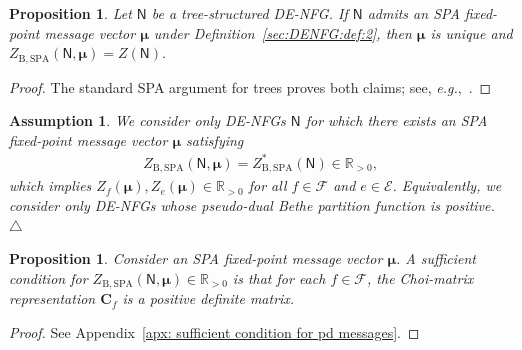 \documentclass[journal]{IEEEtran}
\newcommand{\add}[1]{{\color{black}#1}}
\newtheorem{assumption}[theorem]{Assumption}
\newtheorem{proposition}[theorem]{Proposition}
\newcommand{\manualendsymbol}[1]{%
  \leavevmode\unskip\penalty9999\hbox{}\nobreak\hfill
  \quad\hbox{#1}}
\newcommand{\eremark}{\manualendsymbol{\ensuremath{\triangle}}}
\newcommand{\vect}[1]{ \bm{#1} }
\newcommand{\setEfull}{ \mathcal{E} }
\newcommand{\setF}{ \mathcal{F} }
\newcommand{\sR}{\mathbb{R}}
\newcommand{\vmu}{ \vect{ \mu } }
\newcommand{\graphN}{ \mathsf{N} }
\newcommand{\ZBSPA}{ Z_{\mathrm{B,SPA}} }
\newcommand{\matr}[1]{\vect{#1}}
\newcommand*{\eg}{\textit{e.g.}}
\begin{document}
\begin{proposition}\label{sec:DENFG:prop:1}
  \add{Let $\graphN$ be a tree-structured DE-NFG. If $\graphN$ admits an SPA
    fixed-point message vector $\vmu$ under
    Definition~\ref{sec:DENFG:def:2}, then $\vmu$ is unique and
    $
      \ZBSPA(\graphN,\vmu)=Z(\graphN).
    $}%
\end{proposition}
\begin{proof}
  \add{The standard SPA argument for trees proves both claims; see,
    \eg,~\cite[Theorem~4.2]{J.Wainwright2008}.}
\end{proof}

\begin{assumption}\label{sec:DENFG:remk:1}
  We consider only DE-NFGs $ \graphN $ for which
  there exists an SPA fixed-point message vector $ \vmu $ satisfying
  \begin{align*}
    \ZBSPA(\graphN,\vmu) = \ZBSPA^{*}(\graphN) \in \sR_{>0},
  \end{align*}
  which implies $ Z_f(\vmu),Z_{e}(\vmu) \in \sR_{> 0} $ for all
  $ f \in \setF $ and $ e \in \setEfull $.  Equivalently, we consider only
  DE-NFGs whose pseudo-dual Bethe partition function is positive. \eremark
\end{assumption}

\begin{proposition}
  \label{prop: sufficient condition for pd messages}
  Consider an SPA fixed-point message vector $ \vmu $.  A sufficient condition
  for $ \ZBSPA(\graphN,\vmu) \in \sR_{>0} $ is that for each $ f \in \setF $,
  the Choi-matrix representation $ \matr{C}_{f} $ is a positive definite
  matrix.

\end{proposition}
\begin{proof}
  See Appendix~\ref{apx: sufficient condition for pd messages}.
\end{proof}
\end{document}
